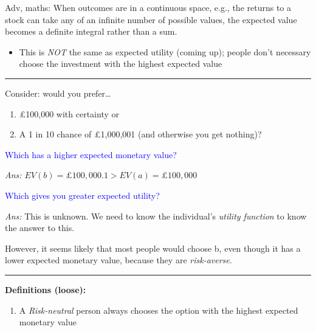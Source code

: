 \documentclass[]{article}
\providecommand{\tightlist}{%
  \setlength{\itemsep}{0pt}\setlength{\parskip}{0pt}}
\begin{document}
\textcolor{RawSienna}{Adv, maths: When outcomes are in a continuous space, e.g., the returns to a stock can take any of an infinite number of possible values, the expected value becomes a definite integral rather than a sum.}

\begin{itemize}
\tightlist
\item
  This is \emph{NOT} the same as expected utility (coming up); people
  don't necessary choose the investment with the highest expected value
\end{itemize}

\begin{center}\rule{0.5\linewidth}{\linethickness}\end{center}

Consider: would you prefer\ldots{}

\begin{enumerate}
\def\labelenumi{\alph{enumi}.}
\tightlist
\item
  \pounds 100,000 with certainty or
\item
  A 1 in 10 chance of \pounds 1,000,001 (and otherwise you get nothing)?
\end{enumerate}

\textcolor{blue}{Which has a higher expected monetary value?}

\emph{Ans: \(EV(b)=\pounds 100,000.1>EV(a)=\pounds 100,000\)}

\bigskip

\textcolor{blue}{Which gives you greater expected utility?}

\emph{Ans:} This is unknown. We need to know the individual's
\emph{utility function} to know the answer to this.

However, it seems likely that most people would choose b, even though it
has a lower expected monetary value, because they are
\emph{risk-averse}.

\begin{center}\rule{0.5\linewidth}{\linethickness}\end{center}

\textbf{Definitions (loose):}

\begin{enumerate}
\def\labelenumi{\arabic{enumi}.}
\tightlist
\item
  A \emph{Risk-neutral} person always chooses the option with the
  highest expected monetary value
\end{enumerate}

\bigskip
\end{document}
